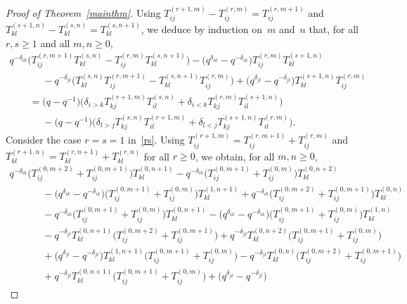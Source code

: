 \begin{proof}[Proof of Theorem~\ref{mainthm}]
Using $T_{ij}^{(r+1,m)} - T_{ij}^{(r,m)}=T_{ij}^{(r,m+1)}$ and $T_{kl}^{(s+1,n)} - T_{kl}^{(s,n)}=T_{kl}^{(s,n+1)}$, we
deduce by induction on~$m$ and~$n$ that, for all $r,s \geq 1$ and all $m,n\ge 0$,
\begin{gather}
q^{-\delta_{ik}} \big(T_{ij}^{(r,m+1)}T_{kl}^{(s,n)} - T_{ij}^{(r,m)} T_{kl}^{(s,n+1)} \big) - \big(q^{\delta_{ik}} -
q^{-\delta_{ik}}\big) T_{ij}^{(r,m)} T_{kl}^{(s+1,n)}
\nonumber
\\
\qquad\phantom{=}{}
  - q^{-\delta_{jl}} \big(T_{kl}^{(s,n)} T_{ij}^{(r,m+1)} - T_{kl}^{(s,n+1)} T_{ij}^{(r,m)} \big) + \big(q^{\delta_{jl}} -
q^{-\delta_{jl}}\big) T_{kl}^{(s+1,n)} T_{ij}^{(r,m)}
\nonumber
\\
\qquad
= \big(q-q^{-1}\big) \big(  \delta_{i>k} T_{kj}^{(r+1,m)} T_{il}^{(s,n)} + \delta_{i<k} T_{kj}^{(r,m)} T_{il}^{(s+1,n)}\big)
\nonumber
\\
\qquad\phantom{=}{}
  - \big(q-q^{-1}\big) \big(\delta_{l>j} T_{kj}^{(s,n)} T_{il}^{(r+1,m)} + \delta_{l<j} T_{kj}^{(s+1,n)} T_{il}^{(r,m)} \big).
\label{rs}
\end{gather}
Consider the case $r=s=1$ in~\eqref{rs}.
Using $T_{ij}^{(r+1,m)}=T_{ij}^{(r,m+1)}+T_{ij}^{(r,m)}$ and $T_{kl}^{(r+1,n)}=T_{kl}^{(r,n+1)}+T_{kl}^{(r,n)}$ for all
$r\ge 0$, we obtain, for all $m,n\ge 0$,
\begin{gather*}
  q^{-\delta_{ik}} \big(T_{ij}^{(0,m+2)} + T_{ij}^{(0,m+1)}\big) T_{kl}^{(0,n+1)} -
q^{-\delta_{ik}}\big(T_{ij}^{(0,m+1)} + T_{ij}^{(0,m)}\big) T_{kl}^{(0,n+2)}
\\
\qquad\phantom{=}{}
  - \big(q^{\delta_{ik}} - q^{-\delta_{ik}}\big) \big(T_{ij}^{(0,m+1)} + T_{ij}^{(0,m)}\big) T_{kl}^{(1,n+1)} + q^{-\delta_{ik}}
\big(T_{ij}^{(0,m+2)} + T_{ij}^{(0,m+1)}\big) T_{kl}^{(0,n)}
\\
\qquad\phantom{=}{}
  - q^{-\delta_{ik}}\big(T_{ij}^{(0,m+1)} + T_{ij}^{(0,m)}\big) T_{kl}^{(0,n+1)} - \big(q^{\delta_{ik}} -
q^{-\delta_{ik}}\big)\big(T_{ij}^{(0,m+1)} + T_{ij}^{(0,m)}\big) T_{kl}^{(1,n)}
\\
\qquad\phantom{=}{}
  - q^{-\delta_{jl}} T_{kl}^{(0,n+1)} \big(T_{ij}^{(0,m+2)} + T_{ij}^{(0,m+1)}\big) +
q^{-\delta_{jl}}T_{kl}^{(0,n+2)}\big(T_{ij}^{(0,m+1)} + T_{ij}^{(0,m)}\big)
\\
\qquad\phantom{=}{}
  + \big(q^{\delta_{jl}} - q^{-\delta_{jl}}\big) T_{kl}^{(1,n+1)} \big(T_{ij}^{(0,m+1)} + T_{ij}^{(0,m)}\big) - q^{-\delta_{jl}}
T_{kl}^{(0,n)} \big(T_{ij}^{(0,m+2)} + T_{ij}^{(0,m+1)}\big)
\\
\qquad\phantom{=}{}
  + q^{-\delta_{jl}}T_{kl}^{(0,n+1)} \big(T_{ij}^{(0,m+1)} + T_{ij}^{(0,m)}\big) + \big(q^{\delta_{jl}} - q^{-\delta_{jl}}\big)

\end{gather*}
\end{proof}
